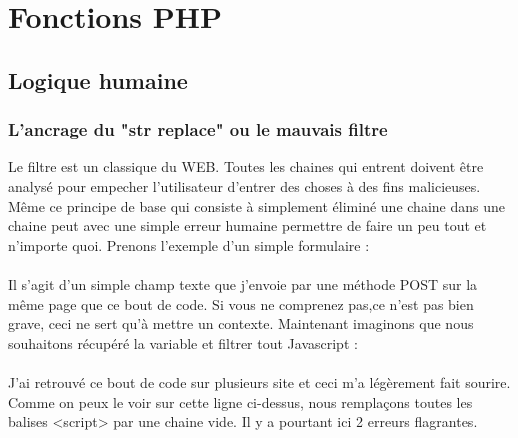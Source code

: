 \documentclass{article}
\begin{document}
\newpage

\section{Fonctions PHP}
\subsection{Logique humaine}
\subsubsection{L'ancrage du "str replace" ou le mauvais filtre}
\hspace*{0.6cm}Le filtre est un classique du WEB. Toutes les chaines qui entrent doivent être analysé pour empecher l'utilisateur d'entrer des choses \`a des fins malicieuses. Même ce principe de base qui consiste à simplement éliminé une chaine dans une chaine peut avec une simple erreur humaine permettre de faire un peu tout et n'importe quoi. Prenons l'exemple d'un simple formulaire :
\vspace{0.2cm}\\
\vspace{0.2cm}\\
\hspace*{0.6cm}Il s'agit d'un simple champ texte que j'envoie par une méthode POST sur la même page que ce bout de code. Si vous ne comprenez pas,ce n'est pas bien grave, ceci ne sert qu'à mettre un contexte. Maintenant imaginons que nous souhaitons récupéré la variable et filtrer tout Javascript :
\vspace{0.2cm}\\
\vspace{0.2cm}\\
J'ai retrouv\'e ce bout de code sur plusieurs site et ceci m'a légèrement fait sourire. Comme on peux le voir sur cette ligne ci-dessus, nous remplaçons toutes les balises <script> par une chaine vide. Il y a pourtant ici 2 erreurs flagrantes.\\
\end{document}
